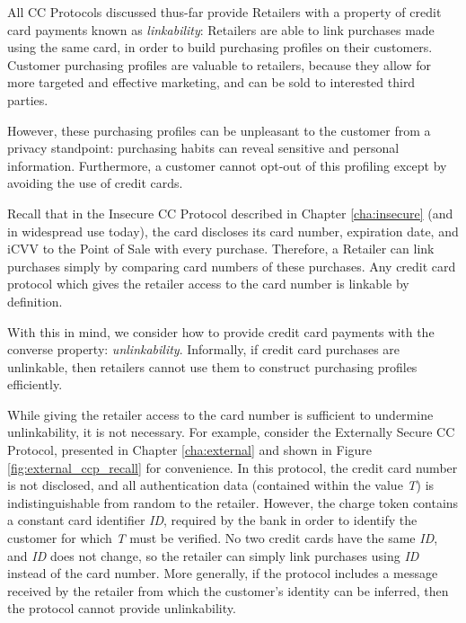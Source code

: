 All CC Protocols discussed thus-far provide Retailers with a property of credit card payments known as \emph{linkability}:
    Retailers are able to link purchases made using the same card, in order to build purchasing profiles on their customers.
Customer purchasing profiles are valuable to retailers, because they allow for more targeted and effective marketing, and can be sold to interested third parties.

However, these purchasing profiles can be unpleasant to the customer from a privacy standpoint:
  purchasing habits can reveal sensitive and personal information.
Furthermore, a customer cannot opt-out of this profiling except by avoiding the use of credit cards.

Recall that in the Insecure CC Protocol described in Chapter \ref{cha:insecure} (and in widespread use today),
  the card discloses its card number, expiration date, and iCVV to the Point of Sale with every purchase.
Therefore, a Retailer can link purchases simply by comparing card numbers of these purchases.
Any credit card protocol which gives the retailer access to the card number is linkable by definition.

With this in mind, we consider how to provide credit card payments with the converse property: \emph{unlinkability}.
Informally, if credit card purchases are unlinkable, then retailers cannot use them to construct purchasing profiles efficiently.

While giving the retailer access to the card number is sufficient to undermine unlinkability, it is not necessary.
For example, consider the Externally Secure CC Protocol, presented in Chapter \ref{cha:external} and shown in Figure \ref{fig:external_ccp_recall} for convenience.
In this protocol, the credit card number is not disclosed, and all authentication data (contained within the value \emph{T}) is indistinguishable from random to the retailer.
However, the charge token contains a constant card identifier \emph{ID}, required by the bank in order to identify the customer for which \emph{T} must be verified.
No two credit cards have the same \emph{ID}, and \emph{ID} does not change, so the retailer can simply link purchases using \emph{ID} instead of the card number.
More generally, if the protocol includes a message received by the retailer from which the customer's identity can be inferred, then the protocol cannot provide unlinkability.

